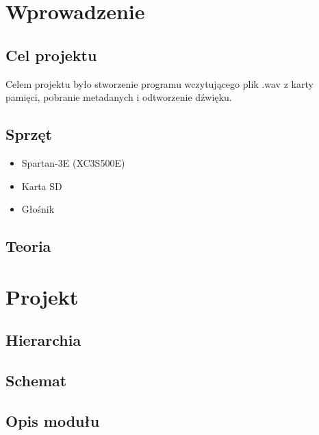 \documentclass{article}
\begin{document}

\newpage
\section{Wprowadzenie}
\subsection{Cel projektu}
\par Celem projektu było stworzenie programu wczytującego plik .wav z karty pamięci, pobranie metadanych i odtworzenie dźwięku.
\subsection{Sprzęt}
\begin{itemize}
	\item{Spartan-3E (XC3S500E)}
	\item{Karta SD}
	\item{Głośnik}
\end{itemize}

\subsection{Teoria}
\par 
\newpage
\section{Projekt}
\subsection{Hierarchia}

\subsection{Schemat}

\subsection{Opis modułu}
\end{document}
